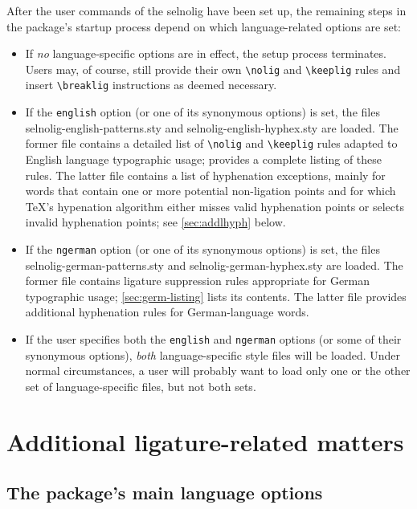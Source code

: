 \documentclass[11pt]{article}
\newcommand{\pkg}[1]{\textsf{#1}}
\newcommand{\opt}[1]{\texttt{#1}}
\newcommand{\cmmd}[1]{\texttt{\textbackslash #1}}
\begin{document}
After the user commands of the \pkg{selnolig} have been set up, the remaining steps in the package's startup process depend on which language-related options are set:
\begin{itemize}
\item If \emph{no} language-specific options are in effect, the setup process terminates. Users may, of course, still provide their own \cmmd{nolig} and \cmmd{keeplig} rules and insert \cmmd{breaklig} instructions as deemed necessary.

\item If the \opt{english} option (or one of its synonymous options) is set, the files \pkg{selnolig-english-patterns.sty} and \pkg{selnolig-english-hyphex.sty} are loaded. The former file contains a detailed list of \cmmd{nolig} and \cmmd{keeplig} rules adapted to English language typographic usage;  provides a complete listing of these rules. The latter file contains a list of hyphenation exceptions, mainly for words that contain one or more potential non-ligation points and for which \TeX's hypenation algorithm either misses valid hyphenation points or selects invalid hyphenation points; see \cref{sec:addlhyph} below.

\item If the \opt{ngerman} option (or one of its synonymous options) is set, the files \pkg{selnolig-german-patterns.sty} and \pkg{selnolig-german-hyphex.sty} are loaded. The former file contains ligature suppression rules appropriate for German typographic usage; \cref{sec:germ-listing} lists its contents. The latter file provides additional hyphenation rules for German-language words.

\item If the user specifies both the \opt{english} and \opt{ngerman} options (or some of their synonymous options), \emph{both} language-specific style files will be loaded. Under normal circumstances, a user will probably want to load only one or the other set of language-specific files, but not both sets.
\end{itemize}



\section{Additional ligature-related matters}
\label{sec:options}


\subsection{The package's main language options}
\end{document}
